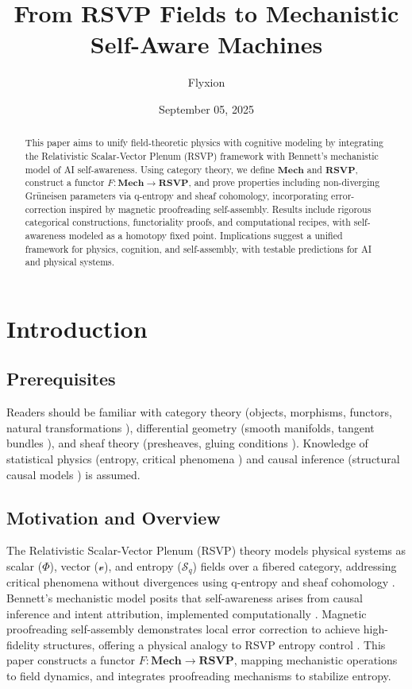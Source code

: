 \documentclass{article}
\title{From RSVP Fields to Mechanistic Self-Aware Machines}
\author{Flyxion}
\date{September 05, 2025}
\theoremstyle{plain}
\theoremstyle{definition}
\begin{document}
\maketitle

\begin{abstract}
This paper aims to unify field-theoretic physics with cognitive modeling by integrating the Relativistic Scalar-Vector Plenum (RSVP) framework with Bennett’s mechanistic model of AI self-awareness. Using category theory, we define $\mathbf{Mech}$ and $\mathbf{RSVP}$, construct a functor $F: \mathbf{Mech} \to \mathbf{RSVP}$, and prove properties including non-diverging Gr\"uneisen parameters via q-entropy and sheaf cohomology, incorporating error-correction inspired by magnetic proofreading self-assembly. Results include rigorous categorical constructions, functoriality proofs, and computational recipes, with self-awareness modeled as a homotopy fixed point. Implications suggest a unified framework for physics, cognition, and self-assembly, with testable predictions for AI and physical systems.
\end{abstract}

\section{Introduction}

\subsection{Prerequisites}
Readers should be familiar with category theory (objects, morphisms, functors, natural transformations \cite{Awodey2010,Lawvere2009}), differential geometry (smooth manifolds, tangent bundles \cite{Kock2004}), and sheaf theory (presheaves, gluing conditions \cite{MacLane1992,Bredon1997}). Knowledge of statistical physics (entropy, critical phenomena \cite{Tsallis1988}) and causal inference (structural causal models \cite{Pearl2009}) is assumed.

\subsection{Motivation and Overview}
The Relativistic Scalar-Vector Plenum (RSVP) theory models physical systems as scalar ($\Phi$), vector ($\mathcal{v}$), and entropy ($\mathcal{S}_q$) fields over a fibered category, addressing critical phenomena without divergences using q-entropy and sheaf cohomology \cite{Soares2024,Tsallis1988,Soares2023}. Bennett’s mechanistic model posits that self-awareness arises from causal inference and intent attribution, implemented computationally \cite{Bennett2025}. Magnetic proofreading self-assembly demonstrates local error correction to achieve high-fidelity structures, offering a physical analogy to RSVP entropy control \cite{Liang2025}. This paper constructs a functor $F: \mathbf{Mech} \to \mathbf{RSVP}$, mapping mechanistic operations to field dynamics, and integrates proofreading mechanisms to stabilize entropy.
\end{document}
